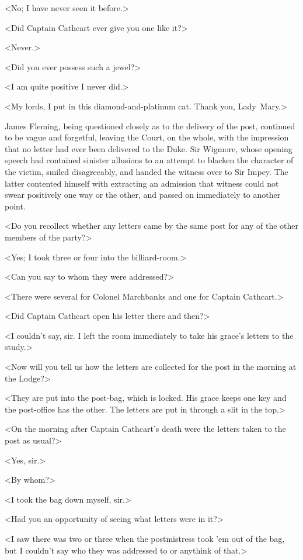 <No; I have never seen it before.>

<Did Captain Cathcart ever give you one like it?>

<Never.>

<Did you ever possess such a jewel?>

<I am quite positive I never did.>

<My lords, I put in this diamond-and-platinum cat. Thank you, Lady~Mary.>

James Fleming, being questioned closely as to the delivery of the post, continued to be vague and forgetful, leaving the Court, on the whole, with the impression that no letter had ever been delivered to the Duke.  Sir Wigmore, whose opening speech had contained sinister allusions to an attempt to blacken the character of the victim, smiled disagreeably, and handed the witness over to Sir Impey. The latter contented himself with extracting an admission that witness could not swear positively one way or the other, and passed on immediately to another point.

<Do you recollect whether any letters came by the same post for any of the other members of the party?>

<Yes; I took three or four into the billiard-room.>

<Can you say to whom they were addressed?>

<There were several for Colonel Marchbanks and one for Captain Cathcart.>

<Did Captain Cathcart open his letter there and then?>

<I couldn't say, sir. I left the room immediately to take his grace's letters to the study.>

<Now will you tell us how the letters are collected for the post in the morning at the Lodge?>

<They are put into the post-bag, which is locked. His grace keeps one key and the post-office has the other. The letters are put in through a slit in the top.>

<On the morning after Captain Cathcart's death were the letters taken to the post as usual?>

<Yes, sir.>

<By whom?>

<I took the bag down myself, sir.>

<Had you an opportunity of seeing what letters were in it?>

<I saw there was two or three when the postmistress took 'em out of the bag, but I couldn't say who they was addressed to or anythink of that.>

